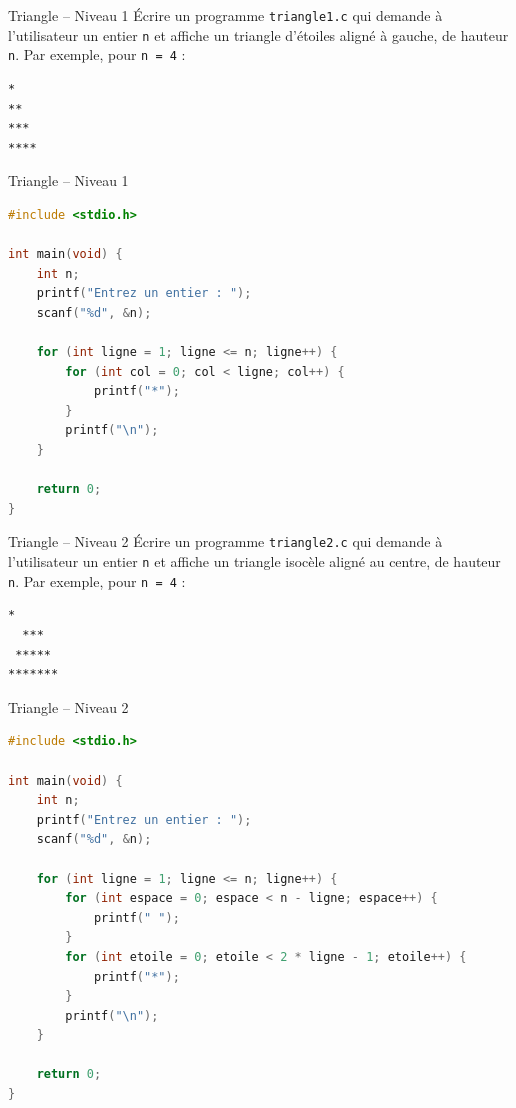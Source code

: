 \begin{UPSTIexercice}{Triangle -- Niveau 1}
	\UPSTIetape Écrire un programme \texttt{triangle1.c} qui demande à l’utilisateur un entier \texttt{n} et affiche un triangle d’étoiles aligné à gauche, de hauteur \texttt{n}.
	Par exemple, pour \texttt{n = 4} :
	\begin{lstlisting}[language=bash,style=console]
*
**
***
****
\end{lstlisting}
\end{UPSTIexercice}

\begin{UPSTIcorrectionP}{Triangle -- Niveau 1}
	\begin{lstlisting}[language=c]
#include <stdio.h>

int main(void) {
    int n;
    printf("Entrez un entier : ");
    scanf("%d", &n);

    for (int ligne = 1; ligne <= n; ligne++) {
        for (int col = 0; col < ligne; col++) {
            printf("*");
        }
        printf("\n");
    }

    return 0;
}
	\end{lstlisting}
\end{UPSTIcorrectionP}

\begin{UPSTIexercice}{Triangle -- Niveau 2}
	\UPSTIetape Écrire un programme \texttt{triangle2.c} qui demande à l’utilisateur un entier \texttt{n} et affiche un triangle isocèle aligné au centre, de hauteur \texttt{n}.
	Par exemple, pour \texttt{n = 4} :
	\begin{lstlisting}[language=bash,style=console]
   *
  ***
 *****
*******
\end{lstlisting}
\end{UPSTIexercice}

\begin{UPSTIcorrectionP}{Triangle -- Niveau 2}
	\begin{lstlisting}[language=c]
#include <stdio.h>

int main(void) {
    int n;
    printf("Entrez un entier : ");
    scanf("%d", &n);

    for (int ligne = 1; ligne <= n; ligne++) {
        for (int espace = 0; espace < n - ligne; espace++) {
            printf(" ");
        }
        for (int etoile = 0; etoile < 2 * ligne - 1; etoile++) {
            printf("*");
        }
        printf("\n");
    }

    return 0;
}
	\end{lstlisting}
\end{UPSTIcorrectionP}

